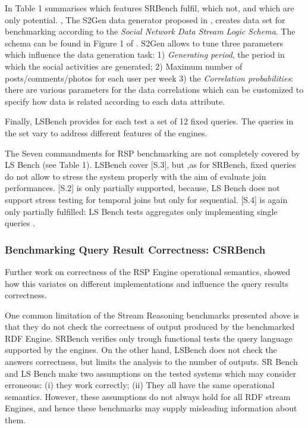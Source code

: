 In \cite{DBLP:conf/esws/ScharrenbachUMVB13} Table 1 summarises which features SRBench fulfil, which not, and which are only potential.
\cite{LePhuoc2012c},
The S2Gen data generator proposed in \cite{LePhuoc2012c}, creates data set for benchmarking according to the \textit{Social Network Data Stream Logic Schema}. The schema can be found in Figure 1 of \cite{LePhuoc2012c}. S2Gen allows to tune three parameters which influence the data generation task: 1) \textit{Generating period}, the period in which the social activities are generated; 2) Maximum number of posts/comments/photos for each user per week 3) the \textit{Correlation probabilities}: there are various parameters for the data correlations which can be customized to specify how data is related according to each data attribute.

Finally, LSBench \cite{LePhuoc2012c} provides for each test a set of 12 fixed queries. The queries in the set vary to address different features of the engines. 

The Seven commandments for RSP benchmarking are not completely covered by LS Bench (see \cite{DBLP:conf/esws/ScharrenbachUMVB13} Table 1). LSBench cover [S.3], but ,as for SRBench, fixed queries do not allow to stress the system properly with the aim of evaluate join performances. [S.2] is only partially supported, because, LS Bench does not support stress testing for temporal joins but only for sequential. [S.4] is again only partially fulfilled: LS Bench tests aggregates only implementing single queries \cite{DBLP:conf/esws/ScharrenbachUMVB13}.

\subsubsection{Benchmarking Query Result Correctness: CSRBench}

Further work on correctness of the RSP Engine operational semantics, showed how this variates on different implementations and influence the query results correctness. \cite{DBLP:conf/semweb/DellAglioCBCV13}

One common limitation of the Stream Reasoning benchmarks presented above is that they do not check the correctness of output produced by the benchmarked RDF Engine. SRBench verifies only trough functional tests the query language supported by the engines. On the other hand, LSBench does not check the answers correctness, but limits the analysis to the number of outputs. 
SR Bench and LS Bench make two assumptions on the tested systems which may consider erroneous: (i) they work correctly; (ii) They all have the same operational semantics. However, these assumptions do not always hold for all RDF stream Engines, and hence these benchmarks may supply misleading information about them.
 
